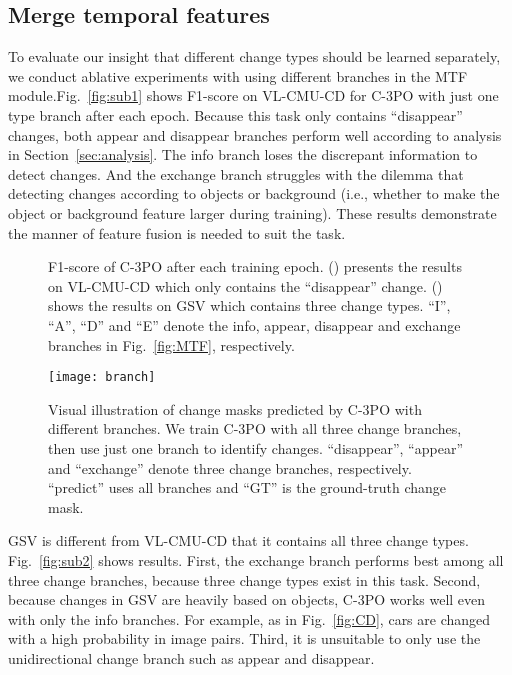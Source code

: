 \documentclass[review]{elsarticle}
\begin{document}
\subsection{Merge temporal features}
\label{sec:merge_t}

To evaluate our insight that different change types should be learned separately, we conduct ablative experiments with using different branches in the MTF module.Fig.~\ref{fig:sub1} shows F1-score on VL-CMU-CD for C-3PO with just one type branch after each epoch. Because this task only contains ``disappear'' changes, both appear and disappear branches perform well according to analysis in Section~\ref{sec:analysis}. The info branch loses the discrepant information to detect changes. And the exchange branch struggles with the dilemma that detecting changes according to objects or background (i.e., whether to make the object or background feature larger during training). These results demonstrate the manner of feature fusion is needed to suit the task.

\begin{figure}
\caption{F1-score of C-3PO after each training epoch. (\protect{}) presents the results on VL-CMU-CD which only contains the ``disappear'' change. (\protect{}) shows the results on GSV which contains three change types. ``I'', ``A'', ``D'' and ``E'' denote the info, appear, disappear and exchange branches in Fig.~\ref{fig:MTF}, respectively.}
\label{fig:CMU_plot} 
\end{figure}

\begin{figure}
	\centering
	\texttt{[image: branch]}
	\caption{Visual illustration of change masks predicted by C-3PO with different branches. We train C-3PO with all three change branches, then use just one branch to identify changes. ``disappear'', ``appear'' and ``exchange'' denote three change branches, respectively. ``predict'' uses all branches and ``GT'' is the ground-truth change mask.}
	\label{fig:branch}
\end{figure}

GSV is different from VL-CMU-CD that it contains all three change types. Fig.~\ref{fig:sub2} shows results. First, the exchange branch performs best among all three change branches, because three change types exist in this task. Second, because changes in GSV are heavily based on objects, C-3PO works well even with only the info branches. For example, as in Fig.~\ref{fig:CD}, cars are changed with a high probability in image pairs. Third, it is unsuitable to only use the unidirectional change branch such as appear and disappear.
\end{document}
